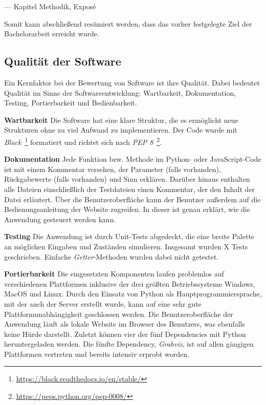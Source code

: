\begin{tcolorbox}[enhanced, frame hidden, borderline west = {1.5pt}{0pt}{gray-700},lower separated=false,fontupper=\sffamily]
\begin{flushright}
    --- Kapitel Methodik, Exposé
\end{flushright}
\end{tcolorbox}

Somit kann abschließend resümiert werden, dass das vorher festgelegte Ziel der Bachelorarbeit erreicht wurde.


\subsection{Qualität der Software}\label{softwarequalität}

Ein Kernfaktor bei der Bewertung von Software ist ihre Qualität. Dabei bedeutet Qualität im Sinne der Softwareentwicklung: Wartbarkeit, Dokumentation, Testing, 
Portierbarkeit und Bedienbarkeit.  

\noindent\textbf{Wartbarkeit} Die Software hat eine klare Struktur, die es ermöglicht neue Strukturen ohne zu viel Aufwand zu implementieren.
Der Code wurde mit \textit{Black}~\footnote{\hspace{1.5mm}\url{https://black.readthedocs.io/en/stable/}} formatiert und richtet sich nach \textit{PEP 8}~\footnote{\hspace{1.5mm}\url{https://peps.python.org/pep-0008/}}.

\noindent\textbf{Dokumentation} Jede Funktion bzw. Methode im Python- oder JavaScript-Code ist mit einem Kommentar versehen, der Parameter (falls vorhanden), Rückgabewerte (falls vorhanden) und
Sinn erklären. Darüber hinaus enthalten alle Dateien einschließlich der Testdateien einen Kommentar, der den Inhalt der Datei erläutert.
Über die Benutzeroberfläche kann der Benutzer außerdem auf die Bedienungsanleitung der Website zugreifen. In dieser ist genau erklärt, wie die Anwendung gesteuert werden kann. 

\noindent\textbf{Testing} Die Anwendung ist durch Unit-Tests abgedeckt, die eine breite Palette an möglichen Eingaben und Zuständen simulieren.
Insgesamt wurden {\color{red} X} Tests geschrieben. Einfache \textit{Getter}-Methoden wurden dabei nicht getestet.

\noindent\textbf{Portierbarkeit} Die eingesetzten Komponenten laufen problemlos auf verschiedenen Plattformen inklusive der drei größten Betriebssysteme Windows, MacOS und Linux.
Durch den Einsatz von Python als Hauptprogrammiersprache, mit der auch der Server erstellt wurde, kann auf eine sehr gute Plattformunabhängigkeit geschlossen werden.
Die Benutzeroberfläche der Anwendung läuft als lokale Website im Browser des Benutzers, was ebenfalls keine Hürde darstellt. Zuletzt können vier der fünf Dependencies mit Python
heruntergeladen werden. Die fünfte Dependency, \textit{Grahviz}, ist auf allen gängigen Plattformen vertreten und bereits intensiv erprobt worden. 

